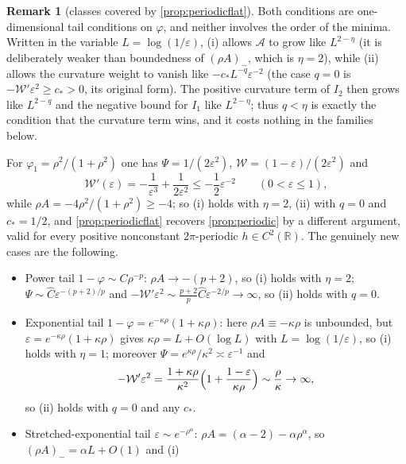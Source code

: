 \documentclass[11pt]{article}
\theoremstyle{definition}
\newtheorem{remark}[theorem]{Remark}
\newcommand{\R}{\mathbb{R}}
\begin{document}
\begin{remark}[classes covered by \cref{prop:periodicflat}]\label{rem:periodicflat}
Both conditions are one-dimensional tail conditions on $\varphi$, and neither
involves the order of the minima.  Written in the variable
$L=\log(1/\varepsilon)$, (i) allows $\mathcal A$ to grow like $L^{2-\eta}$
(it is deliberately weaker than boundedness of $(\rho A)_-$, which is
$\eta=2$), while (ii) allows the curvature weight to vanish like
$-c_*L^{-q}\varepsilon^{-2}$ (the case $q=0$ is
$-\mathcal W'\varepsilon^2\ge c_*>0$, its original form).  The positive
curvature term of $I_2$ then grows like $L^{2-q}$ and the negative bound for
$I_1$ like $L^{2-\eta}$; thus $q<\eta$ is exactly the condition that the
curvature term wins, and it costs nothing in the families below.

For $\varphi_1=\rho^2/(1+\rho^2)$ one has $\Psi=1/(2\varepsilon^2)$,
$\mathcal W=(1-\varepsilon)/(2\varepsilon^2)$ and
\begin{equation}
\mathcal W'(\varepsilon)=-\frac1{\varepsilon^3}+\frac1{2\varepsilon^2}
\le-\frac12\varepsilon^{-2}\qquad(0<\varepsilon\le1),
\end{equation}
while $\rho A=-4\rho^2/(1+\rho^2)\ge-4$; so (i) holds with $\eta=2$, (ii)
with $q=0$ and $c_*=1/2$, and
\cref{prop:periodicflat} recovers \cref{prop:periodic} by a different
argument, valid for every positive nonconstant $2\pi$-periodic $h\in C^2(\R)$.
The genuinely new cases are the following.
\begin{itemize}
\item Power tail $1-\varphi\sim C\rho^{-p}$: $\rho A\to-(p+2)$, so (i) holds
with $\eta=2$; $\Psi\sim\widehat C\varepsilon^{-(p+2)/p}$ and
$-\mathcal W'\varepsilon^2\sim\frac{p+2}{p}\widehat
C\varepsilon^{-2/p}\to\infty$, so (ii) holds with $q=0$.
\item Exponential tail $1-\varphi=e^{-\kappa\rho}(1+\kappa\rho)$: here
$\rho A\equiv-\kappa\rho$ is unbounded, but $\varepsilon=e^{-\kappa\rho}(1+\kappa\rho)$
gives $\kappa\rho=L+O(\log L)$ with $L=\log(1/\varepsilon)$, so (i) holds with
$\eta=1$; moreover $\Psi=e^{\kappa\rho}/\kappa^2\asymp\varepsilon^{-1}$ and
\begin{equation}
-\mathcal W'\varepsilon^2=\frac{1+\kappa\rho}{\kappa^2}
\Bigl(1+\frac{1-\varepsilon}{\kappa\rho}\Bigr)\sim\frac{\rho}{\kappa}\to\infty ,
\end{equation}
so (ii) holds with $q=0$ and any $c_*$.
\item Stretched-exponential tail $\varepsilon\sim e^{-\rho^\alpha}$:
$\rho A=(\alpha-2)-\alpha\rho^\alpha$, so $(\rho A)_-=\alpha L+O(1)$ and (i)

\end{itemize}
\end{remark}
\end{document}
